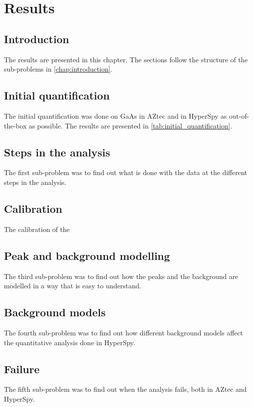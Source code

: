 \chapter{Results}


\section{Introduction}
\label{sec:results:intro}
The results are presented in this chapter.
The sections follow the structure of the sub-problems in \cref{chap:introduction}.

\section{Initial quantification}
\label{sec:results:initial_quantification}
The initial quantification was done on GaAs in AZtec and in HyperSpy as out-of-the-box as possible. The results are presented in \cref{tab:initial_quantification}.






\section{Steps in the analysis}
\label{sec:results:steps}
The first sub-problem was to find out what is done with the data at the different steps in the analysis.


\section{Calibration}
\label{sec:results:calibration}
The calibration of the



\section{Peak and background modelling}
\label{sec:results:modelling}
The third sub-problem was to find out how the peaks and the background are modelled in a way that is easy to understand.


\section{Background models}
\label{sec:results:background}
The fourth sub-problem was to find out how different background models affect the quantitative analysis done in HyperSpy.


\section{Failure}
\label{sec:results:failure}
The fifth sub-problem was to find out when the analysis fails, both in AZtec and HyperSpy.
